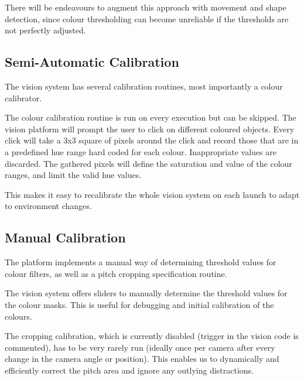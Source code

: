 There will be endeavours to augment this approach with movement and shape detection, since colour thresholding can become unreliable if the thresholds are not perfectly adjusted.


\subsection{Semi-Automatic Calibration}

The vision system has several calibration routines, most importantly a colour calibrator. 

The colour calibration routine is run on every execution but can be skipped. The vision platform will prompt the user to click on different coloured objects. Every click will take a 3x3 square of pixels around the click and record those that are in a predefined hue range hard coded for each colour. Inappropriate values are discarded. The gathered pixels will define the saturation and value of the colour ranges, and limit the valid hue values.

This makes it easy to recalibrate the whole vision system on each launch to adapt to environment changes.


\subsection{Manual Calibration}
The platform implements a manual way of determining threshold values for colour filters, as well as a pitch cropping specification routine.

The vision system offers sliders to manually determine the threshold values for the colour masks. This is useful for debugging and initial calibration of the colours.

The cropping calibration, which is currently disabled (trigger in the vision code is commented), has to be very rarely run (ideally once per camera after every change in the camera angle or position). This enables us to dynamically and efficiently correct the pitch area and ignore any outlying distractions.
